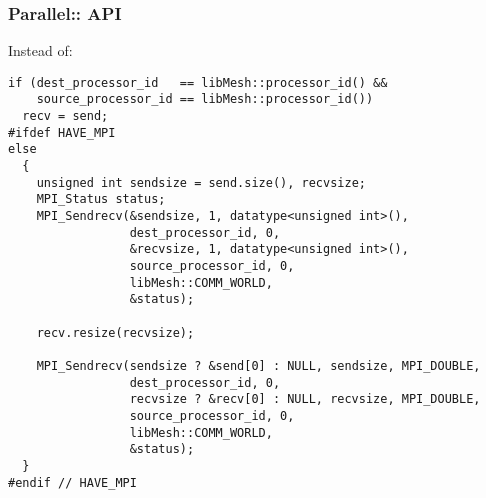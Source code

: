 \begin{frame}
\frametitle{Parallel:: API}

Instead of:
\begin{lstlisting}
if (dest_processor_id   == libMesh::processor_id() &&
    source_processor_id == libMesh::processor_id())
  recv = send;
#ifdef HAVE_MPI
else
  {
    unsigned int sendsize = send.size(), recvsize;
    MPI_Status status;
    MPI_Sendrecv(&sendsize, 1, datatype<unsigned int>(),
                 dest_processor_id, 0,
                 &recvsize, 1, datatype<unsigned int>(),
                 source_processor_id, 0,
                 libMesh::COMM_WORLD,
                 &status);

    recv.resize(recvsize);

    MPI_Sendrecv(sendsize ? &send[0] : NULL, sendsize, MPI_DOUBLE,
                 dest_processor_id, 0,
                 recvsize ? &recv[0] : NULL, recvsize, MPI_DOUBLE,
                 source_processor_id, 0,
                 libMesh::COMM_WORLD,
                 &status);
  }
#endif // HAVE_MPI
\end{lstlisting}
\end{frame}


